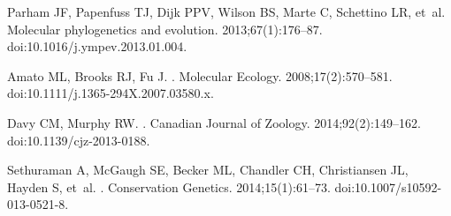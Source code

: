 \documentclass[10pt,letterpaper]{article}
\begin{document}
\begin{thebibliography}{10}
  Parham JF, Papenfuss TJ, Dijk PPV, Wilson BS, Marte C, Schettino LR, et~al.
\newblock Molecular phylogenetics and evolution. 2013;67(1):176--87.
\newblock doi:{10.1016/j.ympev.2013.01.004}.

  Amato ML, Brooks RJ, Fu J.
.
\newblock Molecular Ecology. 2008;17(2):570--581.
\newblock doi:{10.1111/j.1365-294X.2007.03580.x}.

  Davy CM, Murphy RW.
.
\newblock Canadian Journal of Zoology. 2014;92(2):149--162.
\newblock doi:{10.1139/cjz-2013-0188}.

  Sethuraman A, McGaugh SE, Becker ML, Chandler CH, Christiansen JL, Hayden S,
  et~al.
.
\newblock Conservation Genetics. 2014;15(1):61--73.
\newblock doi:{10.1007/s10592-013-0521-8}.

\end{thebibliography}
\end{document}
